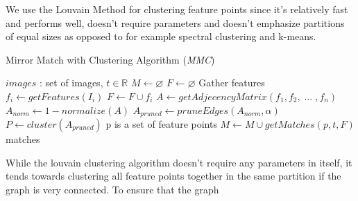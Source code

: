 \documentclass[12pt,journal,compsoc]{IEEEtran}
\begin{document}
%
%
We use the Louvain Method\cite{blondel2008} for clustering feature 
points since it's relatively fast and performs 
well\cite{lancichinetti2009}, doesn't require 
parameters\cite{blondel2008} and doesn't emphasize partitions of equal 
sizes as opposed to for example spectral clustering and 
k-means\cite{von2007}.
%
\begin{algorithm}
\caption{Mirror Match with Clustering Algorithm (\emph{MMC})}
\label{alg-mmc}
\begin{algorithmic}
\Require $images$ : set of images, $t \in \mathbb{R}$
\State $M\gets \varnothing$
\State $F\gets \varnothing$
 \Comment Gather features
	\State $f_i\gets getFeatures(I_i)$
	\State $F\gets F \cup f_i$
\EndFor
\State $A\gets getAdjecencyMatrix(f_1, f_2,\; \ldots \;, f_n)$
\State $A_{norm}\gets 1 - normalize(A)$
\State $A_{pruned}\gets pruneEdges(A_{norm},\alpha)$
\State $P\gets cluster(A_{pruned})$
 \Comment p is a set of feature points
	\State $M\gets M \cup getMatches(p, t, F)$
\EndFor \\
\Return matches
\end{algorithmic}
\end{algorithm}
%
While the louvain clustering algorithm doesn't require any parameters in 
itself, it tends towards clustering all feature points together in the 
same partition if the graph is very connected.  To ensure that the graph 
\end{document}
